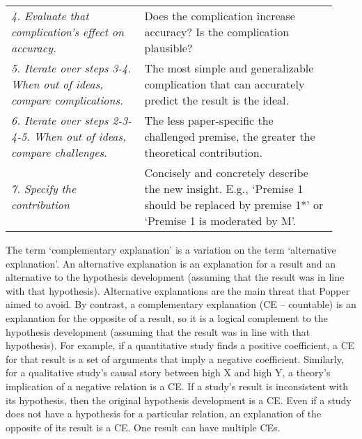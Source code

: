 \documentclass[authordate, meta,issue]{jote-new-article}
\begin{document}
\begin{table}[t!]
\begin{fullwidth}
\begin{tabularx}{\columnwidth}{@{}>{\RaggedRight\arraybackslash}p{0.38\linewidth} >{\RaggedRight\arraybackslash}p{0.55\linewidth}@{}}
      \emph{4. Evaluate that complication's effect on accuracy.}                   & Does the complication increase accuracy? Is the complication plausible?                                                                                                                                                                                                                           \\
      \emph{5. Iterate over steps 3-4. When out of ideas, compare complications.}  & The most  simple and generalizable  complication that can  accurately  predict the result is the ideal.                                                                                                                                                                                           \\
      \emph{6. Iterate over steps 2-3-4-5. When out of ideas, compare challenges.} & The  less paper-specific the challenged premise, the greater the theoretical contribution.                                                                                                                                                                                                        \\
      \emph{7. Specify the contribution}                                           & Concisely and concretely describe the new insight.  \newline E.g., ‘Premise 1 should be replaced by premise 1*' or ‘Premise 1 is moderated by M'.                                                                                                                                                 \\
    \end{tabularx}
  \end{fullwidth}
\end{table}
The term ‘complementary explanation' is a variation on the term ‘alternative explanation'. An alternative explanation is an explanation for a result and an alternative to the hypothesis development (assuming that the result was in line with that hypothesis). Alternative explanations are the main threat that Popper aimed to avoid. By contrast, a complementary explanation (CE -- countable) is an explanation for the opposite of a result, so it is a logical complement to the hypothesis development (assuming that the result was in line with that hypothesis). For example, if a quantitative study finds a positive coefficient, a CE for that result is a set of arguments that imply a negative coefficient. Similarly, for a qualitative study's causal story between high X and high Y, a theory's implication of a negative relation is a CE. If a study's result is inconsistent with its hypothesis, then the original hypothesis development is a CE. Even if a study does not have a hypothesis for a particular relation, an explanation of the opposite of its result is a CE. One result can have multiple CEs.
\end{document}
